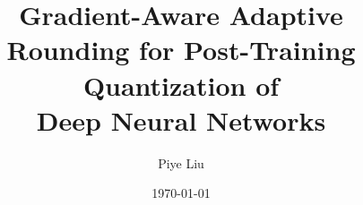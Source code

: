 \documentclass[system, master, english]{systemM}
\title{Gradient-Aware Adaptive Rounding for Post-Training Quantization of \\Deep Neural Networks}
\author{Piye Liu}
\date{\today}
\providecommand{\main}{.}
\begin{document}
\maketitle

\frontmatter
\etitle{}



{\makeatletter
\let\ps@jpl@in\ps@empty
\makeatother
\pagestyle{empty}
\tableofcontents
\clearpage}


\mainmatter








\backmatter
\doublespacing


\singlespacing \footnotesize 

\nocite{liuAdaRoundInversion}


\onehalfspacing \normalsize

%
\end{document}
